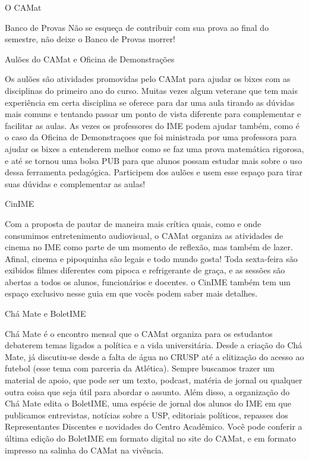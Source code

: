 \begin{secao}{O CAMat}
\begin{subsecao}{Banco de Provas}
Não se esqueça de contribuir com sua prova ao final do semestre, não
deixe o Banco de Provas morrer! 

\end{subsecao}

\begin{subsecao}{Aulões do CAMat e Oficina de Demonstrações}

Os aulões são atividades promovidas pelo CAMat para ajudar os bixes com as
disciplinas do primeiro ano do curso. Muitas vezes algum veterane que tem mais
experiência em certa disciplina se oferece para dar uma aula tirando as dúvidas
mais comuns e tentando passar um ponto de vista diferente para complementar e facilitar
as aulas. As vezes os professores do IME podem ajudar também, como é o caso da Oficina 
de Demonstraçoes que foi ministrada por uma professora para ajudar os bixes a entenderem 
melhor como se faz uma prova matemática rigorosa, e até se tornou uma bolsa PUB para que alunos
possam estudar mais sobre o uso dessa ferramenta pedagógica. 
Participem dos aulões e usem esse espaço para tirar suas dúvidas e complementar as aulas!

\end{subsecao}

\begin{subsecao}{CinIME}

Com a proposta de pautar de maneira mais crítica quais, como e onde consumimos 
entretenimento audiovisual, o CAMat organiza as atividades de cinema no IME 
como parte de um momento de reflexão, mas também de lazer. Afinal, cinema e 
pipoquinha são legais e todo mundo gosta! Toda sexta-feira são exibidos filmes 
diferentes com pipoca e refrigerante de graça, e as sessões são abertas a todos 
os alunos, funcionários e docentes. o CinIME também tem um espaço exclusivo nesse
guia em que vocês podem saber mais detalhes.

\end{subsecao}

\begin{subsecao}{Chá Mate e BoletIME}

Chá Mate é o encontro mensal que o CAMat organiza para os estudantos debaterem temas
ligados a política e a vida universitária. Desde a criação do Chá Mate, já discutiu-se
desde a falta de água no CRUSP até a elitização do acesso ao futebol (esse tema com parceria
da Atlética). Sempre buscamos trazer um material de apoio, que pode ser um texto, podcast, matéria
de jornal ou qualquer outra coisa que seja útil para abordar o assunto. 
Além disso, a organização do Chá Mate edita o BoletIME, uma espécie de jornal dos alunos do IME em
que publicamos entrevistas, notícias sobre a USP, editoriais políticos, repasses dos Representantes
Discentes e novidades do Centro Acadêmico. Você pode conferir a última edição do BoletIME em formato 
digital no site do CAMat, e em formato impresso na salinha do CAMat na vivência.


\end{subsecao}
\end{secao}

